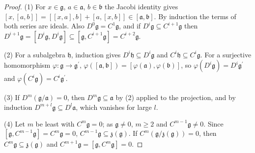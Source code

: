 \begin{proof}
(1) For $x \in \mathfrak{g}$, $a \in \mathfrak{a}$, $b \in \mathfrak{b}$ the Jacobi identity gives $[x, [a, b]] = [[x, a], b] + [a, [x, b]] \in [\mathfrak{a}, \mathfrak{b}]$.
By induction the terms of both series are ideals. Also $D^0\mathfrak{g} = C^1\mathfrak{g}$, and if $D^i\mathfrak{g} \subseteq C^{i+1}\mathfrak{g}$ then
$D^{i+1}\mathfrak{g} = [D^i\mathfrak{g}, D^i\mathfrak{g}] \subseteq [\mathfrak{g}, C^{i+1}\mathfrak{g}] = C^{i+2}\mathfrak{g}$.

(2) For a subalgebra $\mathfrak{h}$, induction gives $D^i\mathfrak{h} \subseteq D^i\mathfrak{g}$ and $C^i\mathfrak{h} \subseteq C^i\mathfrak{g}$. For a surjective
homomorphism $\varphi \colon \mathfrak{g} \to \mathfrak{g}^{\prime}$, $\varphi([\mathfrak{a}, \mathfrak{b}]) = [\varphi(\mathfrak{a}), \varphi(\mathfrak{b})]$, so
$\varphi(D^i\mathfrak{g}) = D^i\mathfrak{g}^{\prime}$ and $\varphi(C^i\mathfrak{g}) = C^i\mathfrak{g}^{\prime}$.

(3) If $D^m(\mathfrak{g}/\mathfrak{a}) = 0$, then $D^m\mathfrak{g} \subseteq \mathfrak{a}$ by (2) applied to the projection, and by induction
$D^{m+l}\mathfrak{g} \subseteq D^l\mathfrak{a}$, which vanishes for large $l$.

(4) Let $m$ be least with $C^m\mathfrak{g} = 0$; as $\mathfrak{g} \neq 0$, $m \geq 2$ and $C^{m-1}\mathfrak{g} \neq 0$. Since
$[\mathfrak{g}, C^{m-1}\mathfrak{g}] = C^m\mathfrak{g} = 0$, $C^{m-1}\mathfrak{g} \subseteq \mathfrak{z}(\mathfrak{g})$. If $C^m(\mathfrak{g}/\mathfrak{z}(\mathfrak{g})) = 0$,
then $C^m\mathfrak{g} \subseteq \mathfrak{z}(\mathfrak{g})$ and $C^{m+1}\mathfrak{g} = [\mathfrak{g}, C^m\mathfrak{g}] = 0$.
\end{proof}

